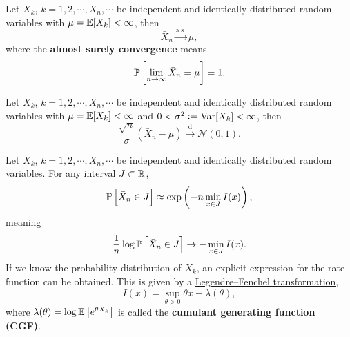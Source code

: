\begin{theorem}
    Let $X_k$, $k = 1, 2, \cdots, X_n, \cdots$ be independent and identically distributed random variables with $\mu = \mathbb{E} [X_k] < \infty$, then 
    \begin{equation*}
        \bar{X}_n \xrightarrow{\text{a.s.}} \mu, 
    \end{equation*}
    where the \textbf{\textcolor{myblue}{almost surely convergence}} means 
    \begin{equation*}
        \mathbb{P} \left[ \lim_{n\to\infty} \bar{X}_n = \mu \right] = 1.
    \end{equation*}
\end{theorem}

\begin{theorem}
    Let $X_k$, $k = 1, 2, \cdots, X_n, \cdots$ be independent and identically distributed random variables with $\mu = \mathbb{E} [X_k] < \infty$ and $0 < \sigma^2 := \mathrm{Var} [X_k] <\infty$, then 
    \begin{equation*}
        \frac{\sqrt{n}}{\sigma} \left( \bar{X}_n - \mu \right) \xrightarrow{\text{d}} \mathcal{N}(0,1).
    \end{equation*}
\end{theorem}

\begin{theorem}
    Let $X_k$, $k = 1, 2, \cdots, X_n, \cdots$ be independent and identically distributed random variables. For any interval $J \subset \mathbb{R}$, 
    \begin{equation*}
        \mathbb{P} \left[ \bar{X}_n \in J \right] \approx \exp \left( - n \min_{x \in J} I (x) \right),
    \end{equation*}
    meaning 
    \begin{equation*}
        \frac{1}{n} \log \mathbb{P} \left[ \bar{X}_n \in J \right] \to - \min_{x \in J} I (x).
    \end{equation*}
    If we know the probability distribution of $X_k$, an explicit expression for the rate function can be obtained. This is given by a \href{https://en.wikipedia.org/wiki/Convex_conjugate}{Legendre–Fenchel transformation},
    \begin{equation*}
        I(x) = \sup_{\theta > 0} \theta x - \lambda(\theta),
    \end{equation*}
    where $\lambda (\theta) = \log \mathbb{E} \left[ e^{\theta X_k} \right]$ is called the \textbf{\textcolor{myblue}{cumulant generating function (CGF)}}.
\end{theorem}

